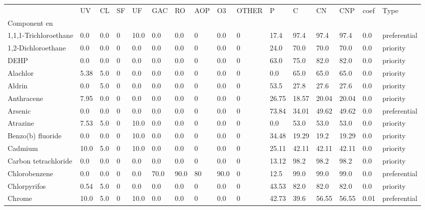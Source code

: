 \begin{tabular}{llllllllllllllll}
 & UV & CL & SF & UF & GAC & RO & AOP & O3 & OTHER & P & C & CN & CNP & coef & Type \\
Component en &  &  &  &  &  &  &  &  &  &  &  &  &  &  &  \\
1,1,1-Trichloroethane & 0.0 & 0.0 & 0 & 10.0 & 0.0 & 0.0 & 0 & 0.0 & 0 & 17.4 & 97.4 & 97.4 & 97.4 & 0.0 & preferential \\
\cline{1-16}
1,2-Dichloroethane & 0.0 & 0.0 & 0 & 0.0 & 0.0 & 0.0 & 0 & 0.0 & 0 & 24.0 & 70.0 & 70.0 & 70.0 & 0.0 & priority \\
\cline{1-16}
DEHP & 0.0 & 0.0 & 0 & 0.0 & 0.0 & 0.0 & 0 & 0.0 & 0 & 63.0 & 75.0 & 82.0 & 82.0 & 0.0 & priority \\
\cline{1-16}
Alachlor & 5.38 & 5.0 & 0 & 0.0 & 0.0 & 0.0 & 0 & 0.0 & 0 & 0.0 & 65.0 & 65.0 & 65.0 & 0.0 & priority \\
\cline{1-16}
Aldrin & 0.0 & 5.0 & 0 & 0.0 & 0.0 & 0.0 & 0 & 0.0 & 0 & 53.5 & 27.8 & 27.6 & 27.6 & 0.0 & priority \\
\cline{1-16}
Anthracene & 7.95 & 0.0 & 0 & 0.0 & 0.0 & 0.0 & 0 & 0.0 & 0 & 26.75 & 18.57 & 20.04 & 20.04 & 0.0 & priority \\
\cline{1-16}
Arsenic & 0.0 & 0.0 & 0 & 0.0 & 0.0 & 0.0 & 0 & 0.0 & 0 & 73.84 & 34.01 & 49.62 & 49.62 & 0.0 & preferential \\
\cline{1-16}
Atrazine & 7.53 & 5.0 & 0 & 10.0 & 0.0 & 0.0 & 0 & 0.0 & 0 & 0.0 & 53.0 & 53.0 & 53.0 & 0.0 & priority \\
\cline{1-16}
Benzo(b) fluoride & 0.0 & 0.0 & 0 & 10.0 & 0.0 & 0.0 & 0 & 0.0 & 0 & 34.48 & 19.29 & 19.2 & 19.29 & 0.0 & priority \\
\cline{1-16}
Cadmium & 10.0 & 5.0 & 0 & 10.0 & 0.0 & 0.0 & 0 & 0.0 & 0 & 25.11 & 42.11 & 42.11 & 42.11 & 0.0 & priority \\
\cline{1-16}
Carbon tetrachloride & 0.0 & 0.0 & 0 & 0.0 & 0.0 & 0.0 & 0 & 0.0 & 0 & 13.12 & 98.2 & 98.2 & 98.2 & 0.0 & priority \\
\cline{1-16}
Chlorobenzene & 0.0 & 0.0 & 0 & 0.0 & 70.0 & 90.0 & 80 & 90.0 & 0 & 12.5 & 99.0 & 99.0 & 99.0 & 0.0 & preferential \\
\cline{1-16}
Chlorpyrifos & 0.54 & 5.0 & 0 & 0.0 & 0.0 & 0.0 & 0 & 0.0 & 0 & 43.53 & 82.0 & 82.0 & 82.0 & 0.0 & priority \\
\cline{1-16}
Chrome & 10.0 & 5.0 & 0 & 10.0 & 0.0 & 0.0 & 0 & 0.0 & 0 & 42.73 & 39.6 & 56.55 & 56.55 & 0.01 & preferential \\
\cline{1-16}

\end{tabular}
